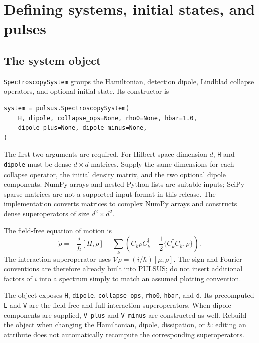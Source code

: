 \section{Defining systems, initial states, and pulses}
\label{sec:systems}

\subsection{The system object}

\texttt{SpectroscopySystem} groups the Hamiltonian, detection dipole,
Lindblad collapse operators, and optional initial state. Its constructor is
\par\noindent
\begin{minipage}{\linewidth}
\begin{lstlisting}[style=python]
system = pulsus.SpectroscopySystem(
    H, dipole, collapse_ops=None, rho0=None, hbar=1.0,
    dipole_plus=None, dipole_minus=None,
)
\end{lstlisting}
\end{minipage}\par
The first two arguments are required. For Hilbert-space dimension $d$,
\texttt{H} and \texttt{dipole} must be dense $d\times d$ matrices. Supply the
same dimensions for each collapse operator, the initial density matrix, and
the two optional dipole components. NumPy arrays and nested Python lists
are suitable inputs; SciPy sparse matrices are not a supported input format
in this release. The implementation converts matrices to complex NumPy
arrays and constructs dense superoperators of size $d^2\times d^2$.

The field-free equation of motion is
\begin{equation}
 \dot\rho=-\frac{i}{\hbar}[H,\rho]
 +\sum_k\left(C_k\rho C_k^\dagger
 -\frac{1}{2}\{C_k^\dagger C_k,\rho\}\right).
\end{equation}
The interaction superoperator uses
$\mathcal V\rho=(i/\hbar)[\mu,\rho]$. The sign and Fourier conventions are
therefore already built into PULSUS; do not insert additional factors of
$i$ into a spectrum simply to match an assumed plotting convention.

The object exposes \texttt{H}, \texttt{dipole}, \texttt{collapse\_ops},
\texttt{rho0}, \texttt{hbar}, and \texttt{d}. Its precomputed
\texttt{L} and \texttt{V} are the field-free and full interaction
superoperators. When dipole components are supplied, \texttt{V\_plus} and
\texttt{V\_minus} are constructed as well. Rebuild the object when changing
the Hamiltonian, dipole, dissipation, or $\hbar$: editing an attribute does
not automatically recompute the corresponding superoperators.

